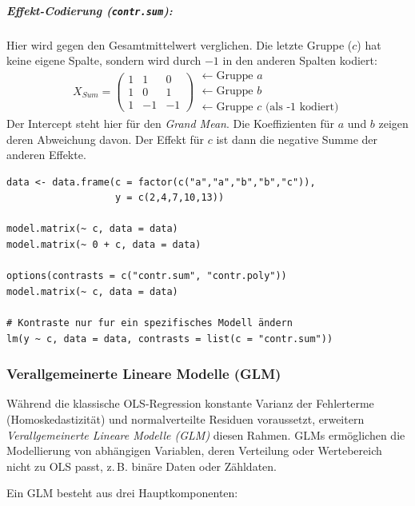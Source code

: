 \documentclass[10pt,twocolumn]{scrartcl}
\begin{document}
\subparagraph{Effekt-Codierung (\texttt{contr.sum}):}
Hier wird gegen den Gesamtmittelwert verglichen. Die letzte Gruppe ($c$) hat keine eigene Spalte, sondern wird durch $-1$ in den anderen Spalten kodiert:
\begin{equation*}
X_{Sum} = \begin{pmatrix}
1 & 1 & 0 \\
1 & 0 & 1 \\
1 & -1 & -1 
\end{pmatrix}
\begin{array}{l}
\leftarrow \text{Gruppe } a \\
\leftarrow \text{Gruppe } b \\
\leftarrow \text{Gruppe } c \text{ (als -1 kodiert)}
\end{array}
\end{equation*}
Der Intercept steht hier für den \textit{Grand Mean}. Die Koeffizienten für $a$ und $b$ zeigen deren Abweichung davon. Der Effekt für $c$ ist dann die negative Summe der anderen Effekte.

\begin{lstlisting}
data <- data.frame(c = factor(c("a","a","b","b","c")),
                   y = c(2,4,7,10,13))

model.matrix(~ c, data = data)
model.matrix(~ 0 + c, data = data)

options(contrasts = c("contr.sum", "contr.poly"))
model.matrix(~ c, data = data)

# Kontraste nur fur ein spezifisches Modell ändern
lm(y ~ c, data = data, contrasts = list(c = "contr.sum"))
\end{lstlisting}


\subsubsection{Verallgemeinerte Lineare Modelle (GLM)}

Während die klassische OLS-Regression konstante Varianz der Fehlerterme (Homoskedastizität) und normalverteilte Residuen voraussetzt, erweitern \emph{Verallgemeinerte Lineare Modelle (GLM)} diesen Rahmen. GLMs ermöglichen die Modellierung von abhängigen Variablen, deren Verteilung oder Wertebereich nicht zu OLS passt, z.\,B. binäre Daten oder Zähldaten.

Ein GLM besteht aus drei Hauptkomponenten:
\end{document}
